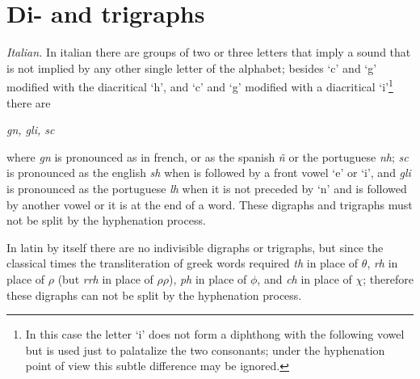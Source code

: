 \documentclass{ltugboat}
\begin{document}
\section{Di- and trigraphs}
{\it  Italian.}  In  italian  there  are groups of two or three letters that
imply a sound that is  not  implied  by  any  other  single  letter  of  the
alphabet; besides `c' and `g' modified with the diacritical `h', and `c' and
`g' modified with a diacritical `i'\footnote{In this  case  the  letter  `i'
does  not  form  a  diphthong  with  the following vowel but is used just to
palatalize the two consonants; under the  hyphenation  point  of  view  this
subtle difference may be ignored.} there are
 \begin{center}\it gn, gli, sc \end{center}
where  {\it  gn}  is pronounced as in french, or as the spanish {\it \~n} or
the portuguese {\it nh\/}; {\it sc} is pronounced as the  english  {\it  sh}
when is followed by a front vowel `e' or `i', and {\it gli} is pronounced as
the portuguese {\it lh} when it is not preceded by `n' and  is  followed  by
another  vowel  or  it is at the end of a word. These digraphs and trigraphs
must not be split by the hyphenation process.

  In latin by itself there are no indivisible digraphs
or trigraphs, but since the classical times  the  transliteration  of  greek
words  required  {\it  th} in place of $\theta$, {\it rh} in place of $\rho$
(but {\it rrh} in place of $\rho\rho$), {\it ph} in  place  of  $\phi$,  and
{\it  ch}  in  place of $\chi$; therefore these digraphs can not be split by
the hyphenation process.
\end{document}
